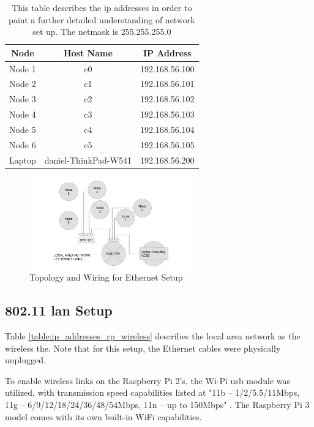 \begin{table}
\begin{center}
 \begin{tabular}{||c c c||} 
 \hline
 Node & Host Name & IP Address \\ [0.5ex] 
 \hline\hline
 Node 1 & c0 & 192.168.56.100 \\ 
 \hline
 Node 2 & c1 & 192.168.56.101  \\
 \hline
 Node 3 & c2 & 192.168.56.102 \\
 \hline
 Node 4 & c3 & 192.168.56.103 \\
 \hline
 Node 5 & c4 & 192.168.56.104 \\
 \hline
 Node 6 & c5 & 192.168.56.105 \\
 \hline 
 Laptop & daniel-ThinkPad-W541 & 192.168.56.200 \\
 \hline
\end{tabular}
\end{center}
\caption{This table describes the \gls{ip} addresses in order to paint a further detailed understanding of network set up.  The netmask is 255.255.255.0}
\label{table:ip_addresses_vm}
\end{table}

\begin{figure}[h]
\centering
\includegraphics[width=7cm]{Figures/lan_eth.pdf}

\caption{Topology and Wiring for Ethernet Setup}

\label{fig:topology_for_ethernet_setup}
\end{figure}

\subsection{802.11 \gls{lan} Setup}

Table \ref{table:ip_addresses_rp_wireless} describes the local area network as the wireless the.  Note that for this setup, the Ethernet cables were physically unplugged.

To enable wireless links on the Raspberry Pi 2's, the Wi-Pi \gls{usb} module was utilized, with transmission speed capabilities listed at "11b – 1/2/5.5/11Mbps, 11g – 6/9/12/18/24/36/48/54Mbps, 11n – up to 150Mbps" \cite{RaspberryHut}.  The Raspberry Pi 3 model comes with its own built-in WiFi capabilities.

